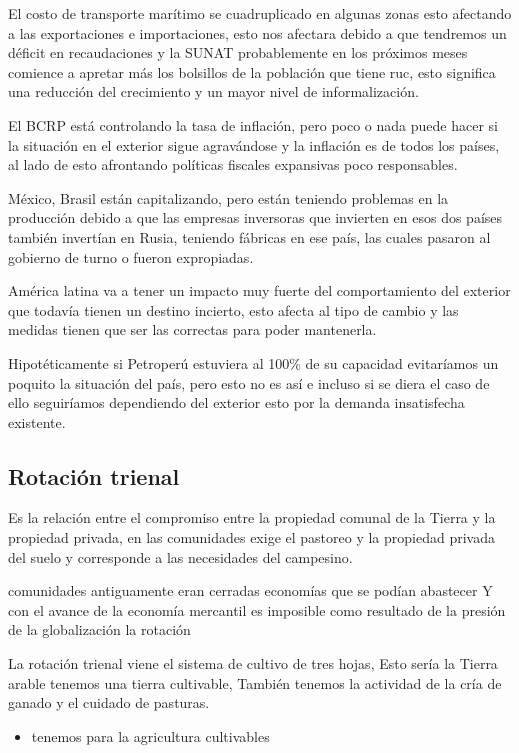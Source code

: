 \documentclass[
  a4paper,
]{article}
\providecommand{\tightlist}{%
  \setlength{\itemsep}{0pt}\setlength{\parskip}{0pt}}\usepackage{longtable,booktabs,array}
\begin{document}
El costo de transporte marítimo se cuadruplicado en algunas zonas esto
afectando a las exportaciones e importaciones, esto nos afectara debido
a que tendremos un déficit en recaudaciones y la SUNAT probablemente en
los próximos meses comience a apretar más los bolsillos de la población
que tiene ruc, esto significa una reducción del crecimiento y un mayor
nivel de informalización.

El BCRP está controlando la tasa de inflación, pero poco o nada puede
hacer si la situación en el exterior sigue agravándose y la inflación es
de todos los países, al lado de esto afrontando políticas fiscales
expansivas poco responsables.

México, Brasil están capitalizando, pero están teniendo problemas en la
producción debido a que las empresas inversoras que invierten en esos
dos países también invertían en Rusia, teniendo fábricas en ese país,
las cuales pasaron al gobierno de turno o fueron expropiadas.

América latina va a tener un impacto muy fuerte del comportamiento del
exterior que todavía tienen un destino incierto, esto afecta al tipo de
cambio y las medidas tienen que ser las correctas para poder mantenerla.

Hipotéticamente si Petroperú estuviera al 100\% de su capacidad
evitaríamos un poquito la situación del país, pero esto no es así e
incluso si se diera el caso de ello seguiríamos dependiendo del exterior
esto por la demanda insatisfecha existente.

\hypertarget{rotaciuxf3n-trienal}{%
\subsection{Rotación trienal}\label{rotaciuxf3n-trienal}}

Es la relación entre el compromiso entre la propiedad comunal de la
Tierra y la propiedad privada, en las comunidades exige el pastoreo y la
propiedad privada del suelo y corresponde a las necesidades del
campesino.

comunidades antiguamente eran cerradas economías que se podían abastecer
Y con el avance de la economía mercantil es imposible como resultado de
la presión de la globalización la rotación

La rotación trienal viene el sistema de cultivo de tres hojas, Esto
sería la Tierra arable tenemos una tierra cultivable, También tenemos la
actividad de la cría de ganado y el cuidado de pasturas.

\begin{itemize}
\tightlist
\item
  tenemos para la agricultura cultivables
\end{itemize}
\end{document}
